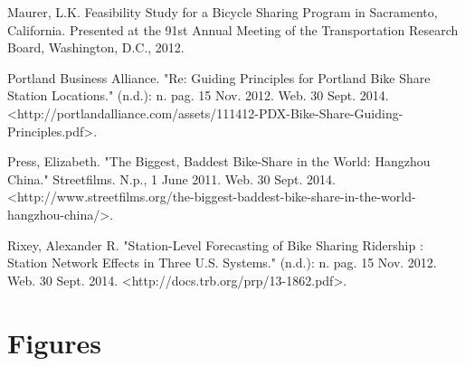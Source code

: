 \documentclass{sig-alternate}
\begin{document}
\begin{enumerate*}
\item Maurer, L.K. Feasibility Study for a Bicycle Sharing Program in Sacramento, California. Presented at the 91st Annual Meeting of the Transportation Research Board, Washington, D.C., 2012.  \newline

\item Portland Business Alliance. "Re: Guiding Principles for Portland Bike Share Station Locations." (n.d.): n. pag. 15 Nov. 2012. Web. 30 Sept. 2014. \newline<http://portlandalliance.com/assets/111412-PDX-\newline Bike-Share-Guiding-Principles.pdf>. \newline

\item Press, Elizabeth. "The Biggest, Baddest Bike-Share in the World: Hangzhou China." Streetfilms. N.p., 1 June 2011. Web. 30 Sept. 2014. \newline<http://www.streetfilms.org/the-biggest-baddest-bike-share-in-the-world-hangzhou-china/>. \newline

\item Rixey, Alexander R. "Station-Level Forecasting of Bike Sharing Ridership : Station Network Effects in Three U.S. Systems." (n.d.): n. pag. 15 Nov. 2012. Web. 30 Sept. 2014. <http://docs.trb.org/prp/13-1862.pdf>. \newline

\end{enumerate*}
\vspace{295pt}

\appendix
\section{Figures}
\label{app:figures}
\end{document}
